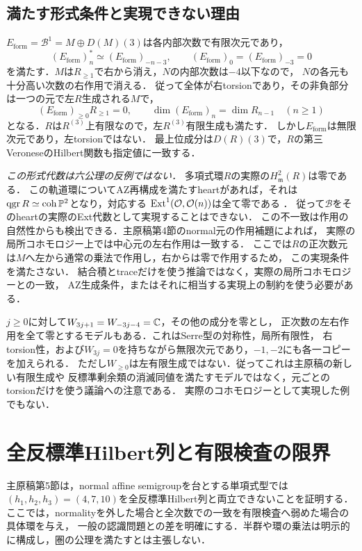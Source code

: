 \documentclass[11pt,a4paper]{ltjsarticle}
\begin{document}
\subsection{満たす形式条件と実現できない理由}
$E_{\mathrm{form}}=\mathcal B^1=M\oplus D(M)(3)$は各内部次数で有限次元であり，
\[
 (E_{\mathrm{form}})_n^*\simeq(E_{\mathrm{form}})_{-n-3},\qquad
 (E_{\mathrm{form}})_0=(E_{\mathrm{form}})_{-3}=0
\]
を満たす．$M$は$R_{\geq1}$で右から消え，$N$の内部次数は$-4$以下なので，
$N$の各元も十分高い次数の右作用で消える．
従って全体が右torsionであり，その非負部分は一つの元で左$R$生成される$M$で，
\[
 (E_{\mathrm{form}})_{\geq0}R_{\geq1}=0,
 \qquad\dim(E_{\mathrm{form}})_n=\dim R_{n-1}\quad(n\geq1)
\]
となる．$R$は$R^{(3)}$上有限なので，左$R^{(3)}$有限生成も満たす．
しかし$E_{\mathrm{form}}$は無限次元であり，左torsionではない．
最上位成分は$D(R)(3)$で，$R$の第三VeroneseのHilbert関数も指定値に一致する．

\emph{この形式代数は六公理の反例ではない．}
多項式環$R$の実際の$H^2_{\mathfrak m}(R)$は零である．
この軌道環についてAZ再構成を満たすheartがあれば，それは
$\operatorname{qgr} R\simeq\operatorname{coh}\mathbb P^2$となり，対応する
$\operatorname{Ext}^1(\mathcal O,\mathcal O(n))$は全て零である
\cite[Corollary 2.4, Proposition 2.7の重み$(1,1,1)$の場合]{AKO}．
従って$\mathcal B$をそのheartの実際のExt代数として実現することはできない．
この不一致は作用の自然性からも検出できる．主原稿第4節のnormal元の作用補題によれば，
実際の局所コホモロジー上では中心元の左右作用は一致する．
ここでは$R$の正次数元は$M$へ左から通常の乗法で作用し，右からは零で作用するため，
この実現条件を満たさない．
結合積とtraceだけを使う推論ではなく，実際の局所コホモロジーとの一致，
AZ生成条件，またはそれに相当する実現上の制約を使う必要がある．

\begin{remark}[より弱いtorsionモデルの範囲]
$j\geq0$に対して$W_{3j+1}=W_{-3j-4}=\mathbb C$，その他の成分を零とし，
正次数の左右作用を全て零とするモデルもある．これはSerre型の対称性，局所有限性，
右torsion性，および$W_{3j}=0$を持ちながら無限次元であり，$-1,-2$にも各一コピーを加えられる．
ただし$W_{\geq0}$は左有限生成ではない．従ってこれは主原稿の新しい有限生成や
反標準剰余類の消滅同値を満たすモデルではなく，元ごとのtorsionだけを使う議論への注意である．
実際のコホモロジーとして実現した例でもない．
\end{remark}

\section{全反標準Hilbert列と有限検査の限界}\label{sec:hilbert-obstructions}
主原稿第5節は，normal affine semigroupを台とする単項式型では
$(h_1,h_2,h_3)=(4,7,10)$を全反標準Hilbert列と両立できないことを証明する．
ここでは，normalityを外した場合と全次数での一致を有限検査へ弱めた場合の具体環を与え，
一般の認識問題との差を明確にする．半群や環の乗法は明示的に構成し，圏の公理を満たすとは主張しない．
\end{document}
